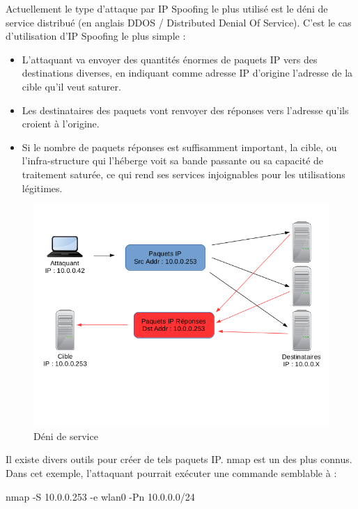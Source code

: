 Actuellement le type d'attaque par IP Spoofing le plus utilisé est le déni de service distribué (en anglais DDOS / Distributed Denial Of Service). C'est le cas d'utilisation d'IP Spoofing le plus simple :
\begin{itemize}
\item L'attaquant va envoyer des quantités énormes de paquets IP vers des destinations diverses, en indiquant comme adresse IP d'origine l'adresse de la cible qu'il veut saturer.
\item Les destinataires des paquets vont renvoyer des réponses vers l'adresse qu'ils croient à l'origine.
\item Si le nombre de paquets réponses est suffisamment important, la cible, ou l'infra-structure qui l'héberge voit sa bande passante ou sa capacité de traitement saturée, ce qui rend ses services injoignables pour les utilisations légitimes.
\end{itemize}

\begin{figure}[hbtp]
\caption{Déni de service}
\centering
\includegraphics[scale=1]{../images/ip-spoofing-ddos.png}
\end{figure}

\begin{tabbing}
\end{tabbing}
Il existe divers outils pour créer de tels paquets IP. nmap est un des plus connus. Dans cet exemple, l'attaquant pourrait exécuter une commande semblable à :
\begin{center}
nmap -S 10.0.0.253 -e wlan0 -Pn 10.0.0.0/24
\end{center}


